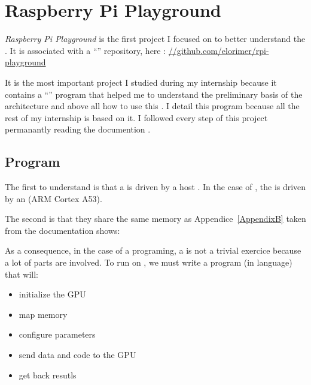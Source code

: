 \section{Raspberry Pi Playground}

\emph{Raspberry Pi Playground} \parencite{refRpiPlayground} is the first project I focused on to better understand the \vc. It is associated with a \enquote{} repository, here : \url{//github.com/elorimer/rpi-playground}

It is the most important project I studied during my internship because it contains a \enquote{} program that helped me to understand the preliminary basis of the \vc{} architecture and above all how to use this . I detail this program because all the rest of my internship is based on it. I followed every step of this project permanantly reading the \vc{} documention \parencite{refVC}.


\subsection{ Program}

The first  to understand is that a  is driven by a host . In the case of \bcm, the \vc{} is driven by an \cpu{}(ARM Cortex A53).

The second  is that they share the same  memory as Appendice~\ref{AppendixB} taken from the \bcm{} documentation \parencite{refBCM} shows:


As a consequence, in the case of a  programing, a  is not a trivial exercice because a lot of parts are involved. To run  on \vc, we must write a \cpu{} program (in  language) that will:
\begin{itemize}
	\item initialize the GPU
	\item map memory
	\item configure parameters
	\item send data and code to the GPU
	\item get back resutls
\end{itemize}
\vspace{10 mm}

